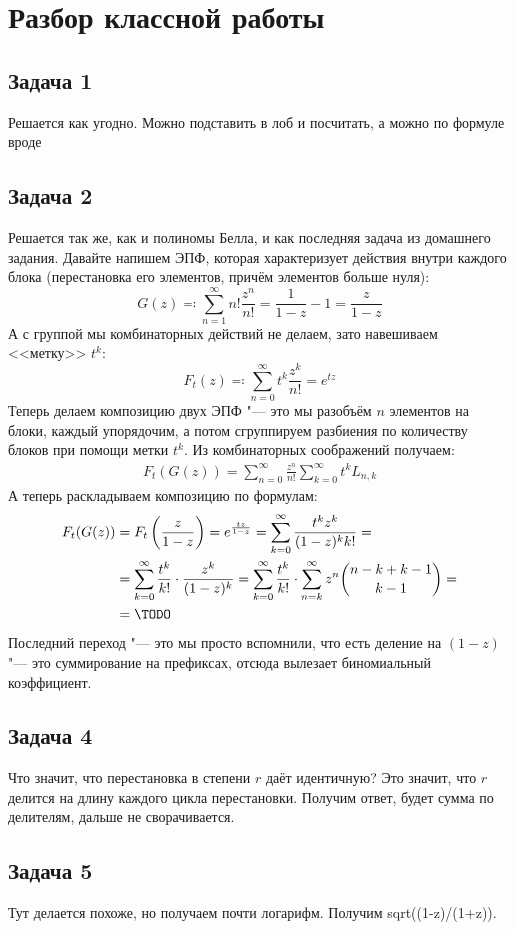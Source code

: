 \section{Разбор классной работы}
\subsection{Задача 1}
	Решается как угодно.
	Можно подставить в лоб и посчитать, а можно по формуле вроде %

\subsection{Задача 2}
	Решается так же, как и полиномы Белла, и как последняя задача из домашнего задания.
	Давайте напишем ЭПФ, которая характеризует действия внутри каждого блока (перестановка его элементов,
	причём элементов больше нуля):
	\[ G(z) \eqcolon \sum_{n=1}^\infty n! \frac{z^n}{n!} = \frac{1}{1-z} - 1 = \frac{z}{1-z} \]
	А с группой мы комбинаторных действий не делаем, зато навешиваем <<метку>> $t^k$:
	\[ F_t(z) \eqcolon \sum_{n=0}^\infty t^k\frac{z^k}{n!} = e^{tz} \]
	Теперь делаем композицию двух ЭПФ "--- это мы разобъём $n$ элементов на блоки,
	каждый упорядочим, а потом сгруппируем разбиения по количеству блоков при помощи метки $t^k$.
	Из комбинаторных соображений получаем:
	\begin{gather*}
		F_t(G(z)) = \sum_{n=0}^{\infty} \frac{z^n}{n!} \sum_{k=0}^\infty t^k L_{n, k}
	\end{gather*}
	А теперь раскладываем композицию по формулам:
	\begin{align*}
		F_t(G(z)) &=
			F_t\left(\frac{z}{1-z}\right) =
			e^{\frac{tz}{1-z}} =
			\sum_{k=0}^\infty \frac{t^kz^k}{(1-z)^kk!} = \\
			&= \sum_{k=0}^\infty \frac{t^k}{k!} \cdot \frac{z^k}{(1-z)^k} =
			\sum_{k=0}^\infty \frac{t^k}{k!} \cdot \sum_{n=k}^\infty z^n \binom{n-k+k-1}{k-1} = \\
			&= \TODO
	\end{align*}
	Последний переход "--- это мы просто вспомнили, что есть деление на $(1-z)$ "--- это
	суммирование на префиксах, отсюда вылезает биномиальный коэффициент.

\subsection{Задача 4}
	Что значит, что перестановка в степени $r$ даёт идентичную?
	Это значит, что $r$ делится на длину каждого цикла перестановки.
	Получим ответ, будет сумма по делителям, дальше не сворачивается.

\subsection{Задача 5}
	Тут делается похоже, но получаем почти логарифм.
	Получим sqrt((1-z)/(1+z)).
